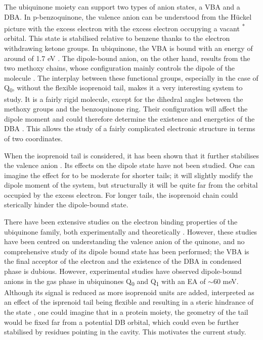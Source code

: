 The ubiquinone moiety can support two types of anion states, a VBA and a DBA. In p-benzoquinone, the valence anion can be understood from the H{\"u}ckel picture with the excess electron with the excess electron occupying a vacant \textpi \textsuperscript{*} orbital. This state is stabilised relative to benzene thanks to the electron withdrawing ketone groups. In ubiquinone, the VBA is bound with an energy of around of 1.7 eV \cite{chen2024low}. The dipole-bound anion, on the other hand, results from the two methoxy chains, whose configuration mainly controls the dipole of the molecule \cite{ameixa2023parent}. The interplay between these functional groups, especially in the case of Q\textsubscript{0}, without the flexible isoprenoid tail, makes it a very interesting system to study. It is a fairly rigid molecule, except for the dihedral angles between the methoxy groups and the benzoquinone ring. Their configuration will affect the dipole moment and could therefore determine the existence and energetics of the DBA \cite{ameixa2023parent,bull2015anion}. This allows the study of a fairly complicated electronic structure in terms of two coordinates.

When the isoprenoid tail is considered, it has been shown that it further stabilises the valence anion \cite{pshenichnyuk2020ionizing}. Its effects on the dipole state have not been studied. One can imagine the effect for to be moderate for shorter tails; it will slightly modify the dipole moment of the system, but structurally it will be quite far from the orbital occupied by the excess electron. For longer tails, the isoprenoid chain could sterically hinder the dipole-bound state.

There have been extensive studies on the electron binding properties of the ubiquinone family, both experimentally \cite{ameixa2023parent,west2014anion,pshenichnyuk2020ionizing,bull2015anion} and theoretically \cite{ameixa2023parent,pshenichnyuk2020ionizing,haldar2020multilayer, nonella1998quantum, gamiz2017terminal}. However, these studies have been centred on understanding the valence anion of the quinone, and no comprehensive study of its dipole bound state has been performed; the VBA is the final acceptor of the electron and the existence of the DBA in condensed phase is dubious.
However, experimental studies have observed dipole-bound anions in the gas phase in ubiquinones Q\textsubscript{0} and Q\textsubscript{1} \cite{ameixa2023parent} with an EA of $\mathrm{\sim}$60 meV. Although its signal is reduced as more isoprenoid units are added, interpreted as an effect of the isprenoid tail being flexible and resulting in a steric hindrance of the state \cite{ameixa2023parent,pshenichnyuk2020ionizing}, one could imagine that in a protein moiety, the geometry of the tail would be fixed far from a potential DB orbital, which could even be further stabilised by residues pointing in the cavity. This motivates the current study.

